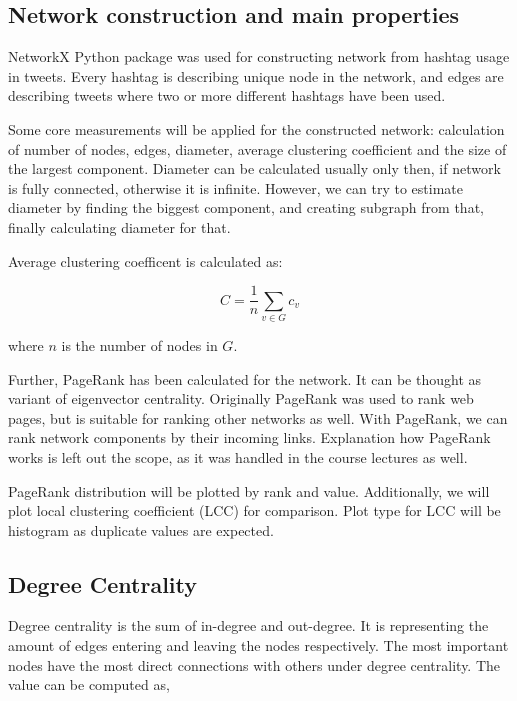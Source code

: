 \subsection{Network construction and main properties}

NetworkX Python package was used for constructing network from hashtag usage in tweets.
Every hashtag is describing unique node in the network, and edges are describing tweets where two or more different hashtags have been used.

Some core measurements will be applied for the constructed network:  calculation of number of nodes, edges, diameter, average clustering coefficient and the size of the largest component.
Diameter can be calculated usually only then, if network is fully connected, otherwise it is infinite.
However, we can try to estimate diameter by finding the biggest component, and creating subgraph from that, finally calculating diameter for that.

Average clustering coefficent is calculated as:

\begin{equation*}\label{eq:clustering-coefficient}
C = \frac{1}{n}\sum_{v \in G} c_v \tag{1}
\end{equation*}

\noindent where $n$ is the number of nodes in $G$.

Further, PageRank has been calculated for the network.
It can be thought as variant of eigenvector centrality.
Originally PageRank was used to rank web pages, but is suitable for ranking other networks as well.\cite{ilprints422}
With PageRank, we can rank network components by their incoming links.
Explanation how PageRank works is left out the scope, as it was handled in the course lectures as well.

PageRank distribution will be plotted by rank and value.
Additionally, we will plot local clustering coefficient (LCC) for comparison.
Plot type for LCC will be histogram as duplicate values are expected.

\subsection{Degree Centrality}

Degree centrality is the sum of in-degree and out-degree.
It is representing the amount of edges entering and leaving the nodes respectively.
The most important nodes have the most direct connections with others under degree centrality.
The value can be computed as,

